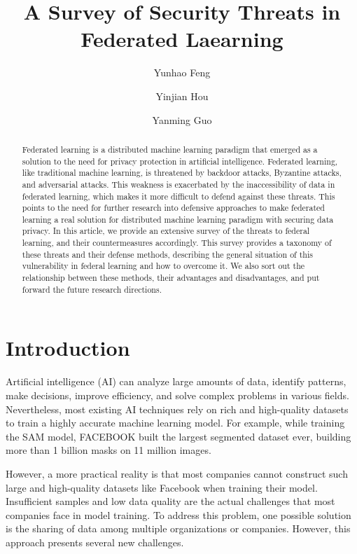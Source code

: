 \documentclass[conference]{IEEEtran}
\begin{document}
\title{A Survey of Security Threats in Federated Laearning}

\author[1]{Yunhao Feng}
\author[1]{Yinjian Hou}
\author[1]{Yanming Guo}

\maketitle

\begin{abstract}
    Federated learning is a distributed machine learning paradigm that emerged as a solution to the need for privacy protection in artificial intelligence. 
    Federated learning, like traditional machine learning, is threatened by backdoor attacks, Byzantine attacks, and adversarial attacks. 
    This weakness is exacerbated by the inaccessibility of data in federated learning, 
    which makes it more difficult to defend against these threats.
    This points to the need for further research into defensive approaches to make federated learning a real solution for distributed machine learning paradigm with securing data privacy.
    In this article, we provide an extensive survey of the threats to federal learning, 
    and their countermeasures accordingly. 
    This survey provides a taxonomy of these threats and their defense methods, 
    describing the general situation of this vulnerability in federal learning and how to overcome it. 
    We also sort out the relationship between these methods, their advantages and disadvantages, and put forward the future research directions.
\end{abstract}



\section{Introduction}
Artificial intelligence (AI) can analyze large amounts of data, 
identify patterns, make decisions, improve efficiency, and solve complex problems 
in various fields.
Nevertheless, most existing AI techniques rely on rich and high-quality 
datasets to train a highly accurate machine learning model.
For example, while training the SAM model, 
FACEBOOK \cite{b1}  built the largest segmented dataset ever, 
building more than 1 billion masks on 11 million images.

However, a more practical reality is that most companies cannot 
construct such large and high-quality datasets like Facebook 
when training their model. 
Insufficient samples and low data quality are the actual challenges 
that most companies face in model training. 
To address this problem, one possible solution 
is the sharing of data among multiple organizations or companies. 
However, this approach presents several new challenges.
\end{document}
